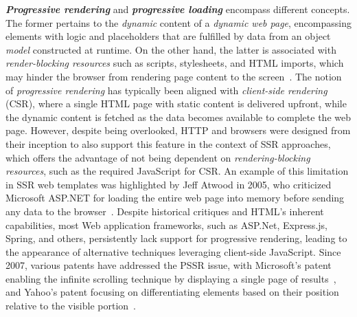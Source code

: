 \textit{\textbf{Progressive rendering}} and \textit{\textbf{progressive loading}}
encompass different concepts. The former pertains to the \textit{dynamic} content of a
\textit{dynamic web page}, encompassing elements with logic and placeholders
that are fulfilled by data from an object \textit{model} constructed at runtime.
On the other hand, the latter is associated with \textit{render-blocking
  resources} such as scripts, stylesheets, and HTML imports, which may hinder the
browser from rendering page content to the screen~\cite{progressive-2022}.
The notion of \textit{progressive rendering} has typically been aligned with
\textit{client-side rendering} (CSR), where a single HTML page with static
content is delivered upfront, while the dynamic content is fetched as the data
becomes available to complete the web page.
However, despite being overlooked, HTTP and browsers were designed from their
inception to also support this feature in the context of SSR approaches,
which offers the advantage of not being dependent on
\textit{rendering-blocking resources}, such as the required JavaScript for CSR.
An example of this limitation in SSR web templates was highlighted by Jeff
Atwood in 2005, who criticized Microsoft ASP.NET for loading the entire web
page into memory before sending any data to the browser~\cite{pssr2005}.
Despite historical critiques and HTML's inherent capabilities, most Web
application frameworks, such as ASP.Net, Express.js, Spring, and others,
persistently lack support for progressive rendering, leading to the appearance
of alternative techniques leveraging client-side JavaScript. Since 2007,
various patents have addressed the PSSR issue, with Microsoft's patent enabling
the infinite scrolling technique by displaying a single page of
results~\cite{scroll2007}, and Yahoo's patent focusing on differentiating
elements based on their position relative to the visible
portion~\cite{schiller2007progressive}.

